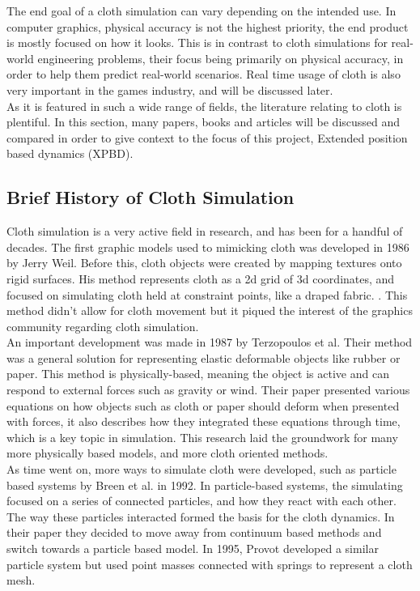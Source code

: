 \documentclass[12pt,a4paper]{article}
\begin{document}
The end goal of a cloth simulation can vary depending on the intended use. In computer graphics, physical accuracy is not the highest priority, the end product is mostly focused on how it looks. This is in contrast to cloth simulations for real-world engineering problems, their focus being primarily on physical accuracy, in order to help them predict real-world scenarios. Real time usage of cloth is also very important in the games industry, and will be discussed later. \\

As it is featured in such a wide range of fields, the literature relating to cloth is plentiful. In this section, many papers, books and articles will be discussed and compared in order to give context to the focus of this project, Extended position based dynamics (XPBD).

\subsection{Brief History of Cloth Simulation}
Cloth simulation is a very active field in research, and has been for a handful of decades. The first graphic models used to mimicking cloth was developed in 1986 by Jerry Weil. Before this, cloth objects were created by mapping textures onto rigid surfaces. His method represents cloth as a 2d grid of 3d coordinates, and focused on simulating cloth held at constraint points, like a draped fabric. \cite{weil_synthesis_1986}. This method didn't allow for cloth movement but it piqued the interest of the graphics community regarding cloth simulation. \\

An important development was made in 1987 by Terzopoulos et al. Their method was a general solution for representing elastic deformable objects like rubber or paper. This method is physically-based, meaning the object is active and can respond to external forces such as gravity or wind. Their paper presented various equations on how objects such as cloth or paper should deform when presented with forces, it also describes how they integrated these equations through time, which is a key topic in simulation. This research laid the groundwork for many more physically based models, and more cloth oriented methods. \cite{terzopoulos1987elastically} \\

As time went on, more ways to simulate cloth were developed, such as particle based systems by Breen et al. in 1992. In particle-based systems, the simulating focused on a series of connected particles, and how they react with each other. The way these particles interacted formed the basis for the cloth dynamics. \cite{breen1992physically} In their paper they decided to move away from continuum based methods and switch towards a particle based model. In 1995, Provot developed a similar particle system but used point masses connected with springs to represent a cloth mesh. \cite{provot1995deformation} \\
\end{document}
